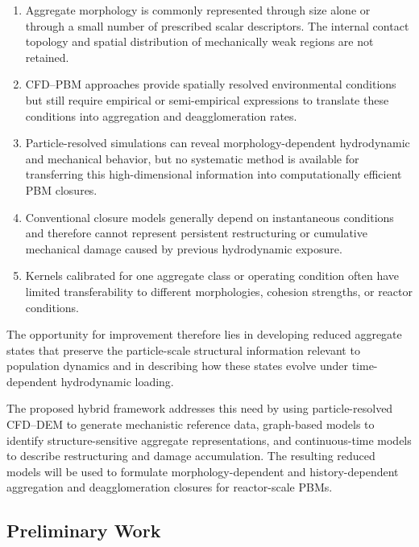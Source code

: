 \documentclass[11pt,a4paper,twoside]{scrartcl}
\begin{document}
\begin{enumerate}
	\item Aggregate morphology is commonly represented through size alone or through a small number of prescribed scalar descriptors. The internal contact topology and spatial distribution of mechanically weak regions are not retained.
	
	\item CFD--PBM approaches provide spatially resolved environmental conditions but still require empirical or semi-empirical expressions to translate these conditions into aggregation and deagglomeration rates.
	
	\item Particle-resolved simulations can reveal morphology-dependent hydrodynamic and mechanical behavior, but no systematic method is available for transferring this high-dimensional information into computationally efficient PBM closures.
	
	\item Conventional closure models generally depend on instantaneous conditions and therefore cannot represent persistent restructuring or cumulative mechanical damage caused by previous hydrodynamic exposure.
	
	\item Kernels calibrated for one aggregate class or operating condition often have limited transferability to different morphologies, cohesion strengths, or reactor conditions.
\end{enumerate}

The opportunity for improvement therefore lies in developing reduced aggregate states that preserve the particle-scale structural information relevant to population dynamics and in describing how these states evolve under time-dependent hydrodynamic loading.

The proposed hybrid framework addresses this need by using particle-resolved CFD--DEM to generate mechanistic reference data, graph-based models to identify structure-sensitive aggregate representations, and continuous-time models to describe restructuring and damage accumulation. The resulting reduced models will be used to formulate morphology-dependent and history-dependent aggregation and deagglomeration closures for reactor-scale PBMs.

\subsection{Preliminary Work}
\end{document}
